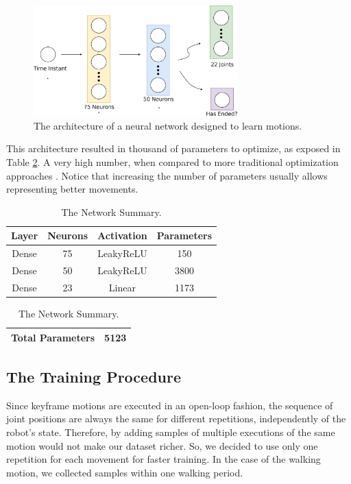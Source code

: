 \begin{figure}[!htbp]
\centering
\includegraphics[width=0.7\textwidth]{Cap5/architecture}
\caption{The architecture of a neural network designed to learn motions.}
\label{fig:model_plot}
\end{figure}

This architecture resulted in thousand of parameters to optimize, as exposed in Table \ref{tab:network_summary}. A very high number, when compared to more traditional optimization approaches \cite{AAAI12-MacAlpine}. Notice that increasing the number of parameters usually allows representing better movements.

\begin{table}[htbp]
\caption{The Network Summary.}
\begin{center}
\begin{tabular}{|c|c|c|c|}
\hline
\textbf{Layer}&{\textbf{Neurons}}& \textbf{Activation}& \textbf{Parameters} \\
\hline
Dense & 75 & LeakyReLU & 150  \\
\hline
Dense & 50 & LeakyReLU & 3800 \\
\hline
Dense & 23 & Linear & 1173 \\
\hline
\end{tabular}
\begin{tabular}{|c|c|}
\hline
\textbf{Total Parameters} & 5123 \\
\hline
\end{tabular}
\label{tab:network_summary}
\end{center}
\end{table}


\subsection{The Training Procedure}
Since keyframe motions are executed in an open-loop fashion, the sequence of joint positions are always the same for different repetitions, independently of the robot's state. Therefore, by adding samples of multiple executions of the same motion would not make our dataset richer. So, we decided to use only one repetition for each movement for faster training. In the case of the walking motion, we collected samples within one walking period.


